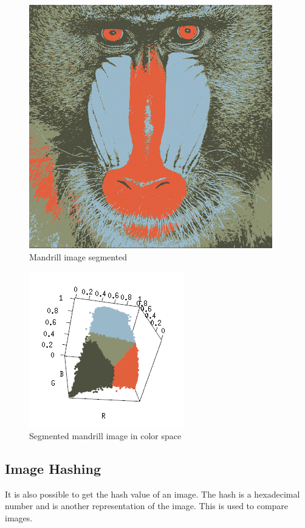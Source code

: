 \documentclass[12pt]{article}
\begin{document}
\begin{figure}[H]
\centering
\includegraphics[scale = 0.5]{img/mandrill_segmented}
\caption{Mandrill image segmented}
\label{mandrill_segmented}
\end{figure}

\begin{figure}[H]
\centering
\includegraphics[scale = 0.9]{img/colormandrill-11}
\caption{Segmented mandrill image in color space}
\label{colorspacemandrill}
\end{figure}

\subsection{Image Hashing}
It is also possible to get the hash value of an image. The hash is a hexadecimal number and is another representation of the image. This is used to compare images. 
\end{document}
